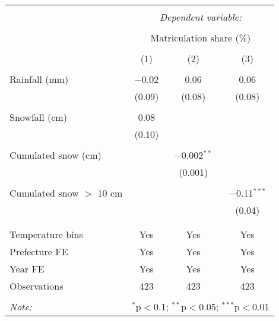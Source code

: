 
\begin{tabular}{@{\extracolsep{5pt}}lccc} 
\\[-1.8ex]\hline 
\hline \\[-1.8ex] 
 & \multicolumn{3}{c}{\textit{Dependent variable:}} \\ 
\cline{2-4} 
\\[-1.8ex] & \multicolumn{3}{c}{Matriculation share (\%)} \\ 
\\[-1.8ex] & (1) & (2) & (3)\\ 
\hline \\[-1.8ex] 
 Rainfall (mm) & $-$0.02 & 0.06 & 0.06 \\ 
  & (0.09) & (0.08) & (0.08) \\ 
  & & & \\ 
 Snowfall (cm) & 0.08 &  &  \\ 
  & (0.10) &  &  \\ 
  & & & \\ 
 Cumulated snow (cm) &  & $-$0.002$^{**}$ &  \\ 
  &  & (0.001) &  \\ 
  & & & \\ 
 Cumulated snow $>$ 10 cm &  &  & $-$0.11$^{***}$ \\ 
  &  &  & (0.04) \\ 
  & & & \\ 
\hline \\[-1.8ex] 
Temperature bins & Yes & Yes & Yes \\ 
Prefecture FE & Yes & Yes & Yes \\ 
Year FE & Yes & Yes & Yes \\ 
Observations & 423 & 423 & 423 \\ 
\hline 
\hline \\[-1.8ex] 
\textit{Note:}  & \multicolumn{3}{r}{$^{*}$p$<$0.1; $^{**}$p$<$0.05; $^{***}$p$<$0.01} \\ 
\end{tabular} 
